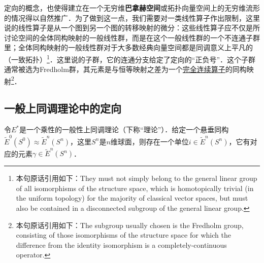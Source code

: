 定向的概念，也使得建立在一个无穷维\textbf{巴拿赫空间}或拓扑向量空间上的无穷维流形的情况得以自然推广．为了做到这一点，我们需要对一类线性算子作出限制，这里说的线性算子是从一个图到另一个图的转移映射的微分：这些线性算子应不仅是所讨论空间的全体同构映射的一般线性群，而是在这个一般线性群的一个不连通子群里；全体同构映射的一般线性群对于大多数经典向量空间都是同调意义上平凡的（一致拓扑）\footnote{本句原话引用如下：They must not simply belong to the general linear group of all isomorphisms of the structure space, which is homotopically trivial (in the uniform topology) for the majority of classical vector spaces, but must also be contained in a disconnected subgroup of the general linear group. }．这里说的子群，它的连通分支给定了定向的“正负号”．这个子群通常被选为Fredholm群，其元素是与恒等映射之差为一个\href{https://encyclopediaofmath.org/wiki/Completely-continuous_operator}{完全连续算子}的同构映射\footnote{本句原话引用如下：The subgroup usually chosen is the Fredholm group, consisting of those isomorphisms of the structure space for which the difference from the identity isomorphism is a completely-continuous operator.}．








\subsection{一般上同调理论中的定向}

令$E^*$是一个乘性的一般性上同调理论（下称“理论”）．给定一个悬垂同构$\widetilde{E}^0(S^0)\approx\widetilde{E}^n(S^n)$，这里$S^n$是$n$维球面，则存在一个单位$i\in \widetilde{E}^n(S^n)$，它有对应的元素$\gamma\in \widetilde{E}^n(S^n)$．

